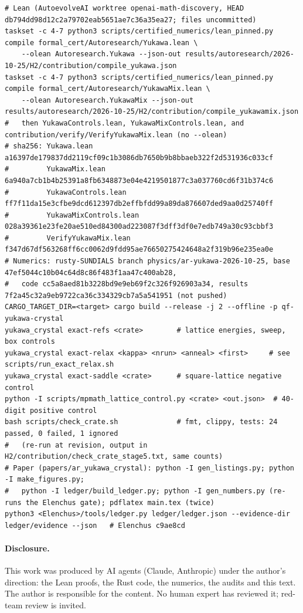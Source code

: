 \documentclass[11pt]{article}
\theoremstyle{remark}
\begin{document}
\begin{Verbatim}[fontsize=\scriptsize,frame=single,framesep=1.5mm]
# Lean (AutoevolveAI worktree openai-math-discovery, HEAD db794dd98d12c2a79702eab5651ae7c36a35ea27; files uncommitted)
taskset -c 4-7 python3 scripts/certified_numerics/lean_pinned.py compile formal_cert/Autoresearch/Yukawa.lean \
    --olean Autoresearch.Yukawa --json-out results/autoresearch/2026-10-25/H2/contribution/compile_yukawa.json
taskset -c 4-7 python3 scripts/certified_numerics/lean_pinned.py compile formal_cert/Autoresearch/YukawaMix.lean \
    --olean Autoresearch.YukawaMix --json-out results/autoresearch/2026-10-25/H2/contribution/compile_yukawamix.json
#   then YukawaControls.lean, YukawaMixControls.lean, and contribution/verify/VerifyYukawaMix.lean (no --olean)
# sha256: Yukawa.lean            a16397de179837dd2119cf09c1b3086db7650b9b8bbaeb322f2d531936c033cf
#         YukawaMix.lean         6a940a7cb1b4b25391a8fb6348873e04e4219501877c3a037760cd6f31b374c6
#         YukawaControls.lean    ff7f11da15e3cfbe9dcd612397db2effbfdd99a89da876607ded9aa0d25740ff
#         YukawaMixControls.lean 028a39361e23fe20ae510ed84300ad223087f3dff3df0e7edb749a30c93cbbf3
#         VerifyYukawaMix.lean   f347d67df563268ff6cc0062d9fdd95ae76650275424648a2f319b96e235ea0e
# Numerics: rusty-SUNDIALS branch physics/ar-yukawa-2026-10-25, base 47ef5044c10b04c64d8c86f483f1aa47c400ab28,
#   code cc5a8aed81b3228bd9e9eb69f2c326f926903a34, results 7f2a45c32a9eb9722ca36c334329cb7a5a541951 (not pushed)
CARGO_TARGET_DIR=<target> cargo build --release -j 2 --offline -p qf-yukawa-crystal
yukawa_crystal exact-refs <crate>        # lattice energies, sweep, box controls
yukawa_crystal exact-relax <kappa> <nrun> <anneal> <first>     # see scripts/run_exact_relax.sh
yukawa_crystal exact-saddle <crate>      # square-lattice negative control
python -I scripts/mpmath_lattice_control.py <crate> <out.json>  # 40-digit positive control
bash scripts/check_crate.sh              # fmt, clippy, tests: 24 passed, 0 failed, 1 ignored
#   (re-run at revision, output in H2/contribution/check_crate_stage5.txt, same counts)
# Paper (papers/ar_yukawa_crystal): python -I gen_listings.py; python -I make_figures.py;
#   python -I ledger/build_ledger.py; python -I gen_numbers.py (re-runs the Elenchus gate); pdflatex main.tex (twice)
python3 <Elenchus>/tools/ledger.py ledger/ledger.json --evidence-dir ledger/evidence --json   # Elenchus c9ae8cd
\end{Verbatim}

\paragraph{Disclosure.} This work was produced by AI agents (Claude, Anthropic) under the author's direction: the Lean
proofs, the Rust code, the numerics, the audits and this text. The author is responsible for the content. No human
expert has reviewed it; red-team review is invited.
\end{document}
